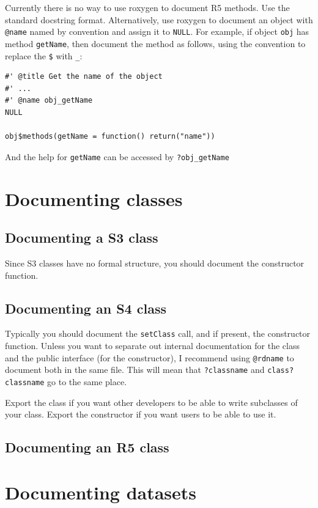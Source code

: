 Currently there is no way to use roxygen to document R5 methods. Use the
standard docstring format. Alternatively, use roxygen to document an
object with \texttt{@name} named by convention and assign it to
\texttt{NULL}. For example, if object \texttt{obj} has method
\texttt{getName}, then document the method as follows, using the
convention to replace the \texttt{\$} with \texttt{\_}:

\begin{verbatim}
#' @title Get the name of the object
#' ...
#' @name obj_getName
NULL

obj$methods(getName = function() return("name"))
\end{verbatim}

And the help for \texttt{getName} can be accessed by
\texttt{?obj\_getName}

\section{Documenting classes}

\subsection{Documenting a S3 class}

Since S3 classes have no formal structure, you should document the
constructor function.

\subsection{Documenting an S4 class}

Typically you should document the \texttt{setClass} call, and if
present, the constructor function. Unless you want to separate out
internal documentation for the class and the public interface (for the
constructor), I recommend using \texttt{@rdname} to document both in the
same file. This will mean that \texttt{?classname} and
\texttt{class?classname} go to the same place.

Export the class if you want other developers to be able to write
subclasses of your class. Export the constructor if you want users to be
able to use it.

\subsection{Documenting an R5 class}

\section{Documenting datasets}

